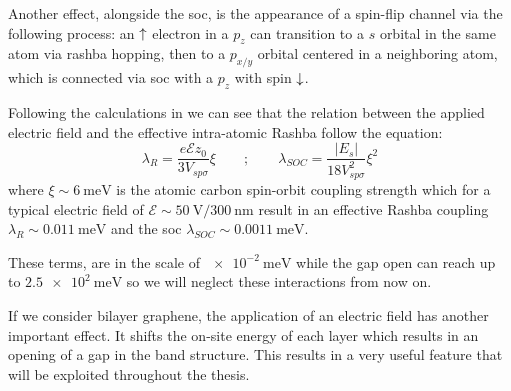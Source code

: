 Another effect, alongside the \ac{soc}, is the appearance of a spin-flip channel via the following process: an $\uparrow$ electron in a $p_z$ can transition to a $s$ orbital in the same atom via rashba hopping, then to a $p_{x/y}$ orbital centered in a neighboring atom, which is connected via \ac{soc} with a $p_z$ with spin $\downarrow$.

Following the calculations in \cite{Min2006} we can see that the relation between the applied electric field and the effective intra-atomic Rashba follow the equation:
\begin{equation}
   \lambda_R=\frac{e\mathcal{E}z_0}{3V_{sp\sigma}}\xi \qquad;\qquad
   \lambda_{SOC}=\frac{|E_{s}|}{18V^2_{sp\sigma}}\xi^2
\end{equation}
where $\xi\sim\SI{6}{\meV}$ is the atomic carbon spin-orbit coupling strength
which for a typical electric field of $\mathcal{E}\sim\SI{50}{\V}/\SI{300}{\nm}$ result in an effective Rashba coupling $\lambda_R\sim\SI{0.011}{\meV}$ and the \ac{soc} $\lambda_{SOC}\sim\SI{0.0011}{\meV}$.

These terms, are in the scale of $\SI{e-2}{\meV}$ while the gap open can reach up to $\SI{2.5e2}{\meV}$ so we will neglect these interactions from now on.
\bigskip


If we consider bilayer graphene, the application of an electric field has another important effect. It shifts the on-site energy of each layer which results in an opening of a gap in the band structure. This results in a very useful feature that will be exploited throughout the thesis.





